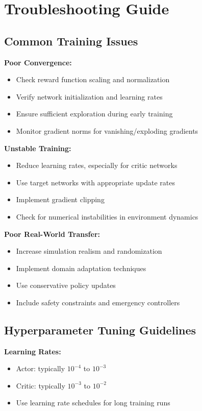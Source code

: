 \section{Troubleshooting Guide}

\subsection{Common Training Issues}

\textbf{Poor Convergence:}
\begin{itemize}
    \item Check reward function scaling and normalization
    \item Verify network initialization and learning rates
    \item Ensure sufficient exploration during early training
    \item Monitor gradient norms for vanishing/exploding gradients
\end{itemize}

\textbf{Unstable Training:}
\begin{itemize}
    \item Reduce learning rates, especially for critic networks
    \item Use target networks with appropriate update rates
    \item Implement gradient clipping
    \item Check for numerical instabilities in environment dynamics
\end{itemize}

\textbf{Poor Real-World Transfer:}
\begin{itemize}
    \item Increase simulation realism and randomization
    \item Implement domain adaptation techniques
    \item Use conservative policy updates
    \item Include safety constraints and emergency controllers
\end{itemize}

\subsection{Hyperparameter Tuning Guidelines}

\textbf{Learning Rates:}
\begin{itemize}
    \item Actor: typically $10^{-4}$ to $10^{-3}$
    \item Critic: typically $10^{-3}$ to $10^{-2}$
    \item Use learning rate schedules for long training runs
\end{itemize}

